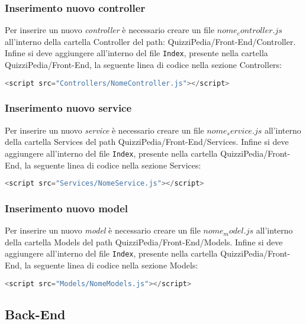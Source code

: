 \subsubsection{Inserimento nuovo controller}  
Per inserire un nuovo \textit{controller} è necessario creare un file $nome_controller.js$ all'interno della cartella Controller del path: QuizziPedia/Front-End/Controller. Infine si deve aggiungere all'interno del file \texttt{Index}, presente nella cartella QuizziPedia/Front-End, la seguente linea di codice nella sezione Controllers:
\begin{lstlisting}[language=Java,firstnumber=1]
	<script src="Controllers/NomeController.js"></script>
\end{lstlisting}

\subsubsection{Inserimento nuovo service}
Per inserire un nuovo \textit{service} è necessario creare un file $nome_service.js$ all'interno della cartella Services del path QuizziPedia/Front-End/Services. Infine si deve aggiungere all'interno del file \texttt{Index}, presente nella cartella QuizziPedia/Front-End, la seguente linea di codice nella sezione Services:
\begin{lstlisting}[language=Java,firstnumber=1]
<script src="Services/NomeService.js"></script>
\end{lstlisting}

\subsubsection{Inserimento nuovo model}
Per inserire un nuovo \textit{model} è necessario creare un file $nome_model.js$ all'interno della cartella Models del path QuizziPedia/Front-End/Models. Infine si deve aggiungere all'interno del file \texttt{Index}, presente nella cartella QuizziPedia/Front-End, la seguente linea di codice nella sezione Models:
\begin{lstlisting}[language=Java,firstnumber=1]
<script src="Models/NomeModels.js"></script>
\end{lstlisting}


\subsection{Back-End}
